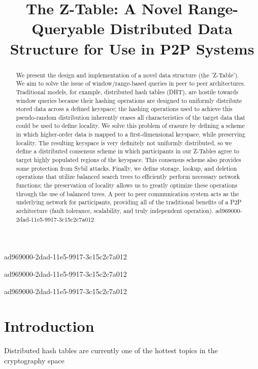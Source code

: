 \documentclass[12pt]{article}
\title{The Z-Table: A Novel Range-Queryable Distributed Data Structure for Use in P2P Systems}
\begin{document}
ad969000-2dad-11e5-9917-3c15c2c7a012\maketitle
ad969000-2dad-11e5-9917-3c15c2c7a012
\begin{abstract}
We present the design and implementation of a novel data structure (the 'Z-Table'). We aim to solve the issue of window/range-based queries in peer to peer architectures. Traditional models, for example,  distributed hash tables (DHT), are hostile towards window queries because their hashing operations are designed to uniformly distribute stored data across a defined keyspace; the hashing operations used to achieve this pseudo-random distribution inherently erases all characteristics of the target data that could be used to define locality. We solve this problem of erasure by defining a scheme in which higher-order data is mapped to a first-dimensional keyspace, while preserving locality. The resulting keyspace is very definitely not uniformly distributed, so we define a distributed consensus scheme in which participants in our Z-Tables agree to target highly populated regions of the keyspace. This consensus scheme also provides some protection from Sybil attacks. Finally, we define storage, lookup, and deletion operations that utilize balanced search trees to efficiently perform necessary network functions; the preservation of locality allows us to greatly optimize these operations through the use of balanced trees. A peer to peer communication system acts as the underlying network for participants, providing all of the traditional benefits of a P2P architecture (fault tolerance, scalability, and truly independent operation).
ad969000-2dad-11e5-9917-3c15c2c7a012\end{abstract}
ad969000-2dad-11e5-9917-3c15c2c7a012

\newpage
\section{Introduction}
Distributed hash tables are currently one of the hottest topics in the cryptography space~\cite{Stoica:2001dj,Rowstron:2001ea,Ratnasamy:2001wn}

\printbibliography
\end{document}
